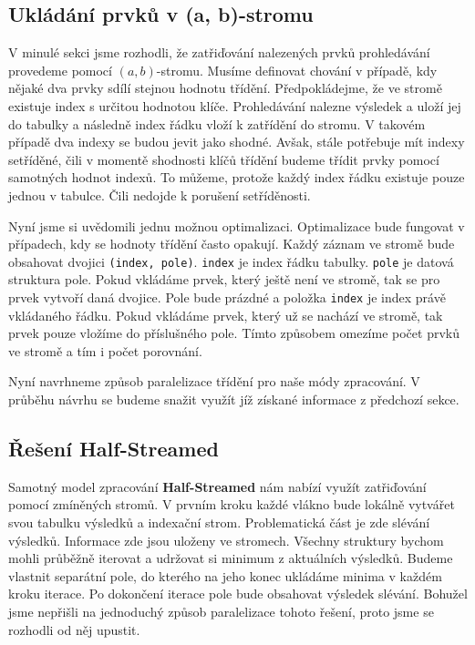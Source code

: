 \subsection{Ukládání prvků v (a, b)-stromu} \label{anal.improvement.orderby.storeindex}

V minulé sekci jsme rozhodli, že zatřiďování nalezených prvků prohledávání provedeme pomocí $(a, b)$-stromu.
Musíme definovat chování v případě, kdy nějaké dva prvky sdílí stejnou hodnotu třídění.
Předpokládejme, že ve stromě existuje index s určitou hodnotou klíče.
Prohledávání nalezne výsledek a uloží jej do tabulky a následně index řádku vloží k zatřídění do stromu.
V takovém případě dva indexy se budou jevit jako shodné.
Avšak, stále potřebuje mít indexy setříděné, čili v momentě shodnosti klíčů třídění budeme třídit prvky pomocí samotných hodnot indexů.
To můžeme, protože každý index řádku existuje pouze jednou v tabulce.
Čili nedojde k porušení setříděnosti.

Nyní jsme si uvědomili jednu možnou optimalizaci.
Optimalizace bude fungovat v případech, kdy se hodnoty třídění často opakují.
Každý záznam ve stromě bude obsahovat dvojici \texttt{(index, pole)}.
\texttt{index} je index řádku tabulky.
\texttt{pole} je datová struktura pole.
Pokud vkládáme prvek, který ještě není ve stromě, tak se pro prvek vytvoří daná dvojice.
Pole bude prázdné a položka \texttt{index} je index právě vkládaného řádku.
Pokud vkládáme prvek, který už se nachází ve stromě, tak prvek pouze vložíme do příslušného pole.
Tímto způsobem omezíme počet prvků ve stromě a tím i počet porovnání.

Nyní navrhneme způsob paralelizace třídění pro naše módy zpracování.
V průběhu návrhu se budeme snažit využít jíž získané informace z předchozí sekce.

\subsection{Řešení Half-Streamed} \label{anal.improvement.orderby.halfstreamed}

Samotný model zpracování \textbf{Half-Streamed} nám nabízí využít zatřiďování pomocí zmíněných stromů.
V prvním kroku každé vlákno bude lokálně vytvářet svou tabulku výsledků a indexační strom.
Problematická část je zde slévání výsledků.
Informace zde jsou uloženy ve stromech.
Všechny struktury bychom mohli průběžně iterovat a udržovat si minimum z aktuálních výsledků.
Budeme vlastnit separátní pole, do kterého na jeho konec ukládáme minima v každém kroku iterace.
Po dokončení iterace pole bude obsahovat výsledek slévání.
Bohužel jsme nepřišli na jednoduchý způsob paralelizace tohoto řešení, proto jsme se rozhodli od něj upustit.

